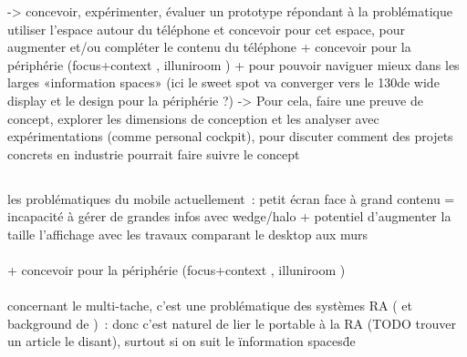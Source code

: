 -> concevoir, expérimenter, évaluer un prototype répondant à la problématique
utiliser l'espace autour du téléphone et concevoir pour cet espace, pour augmenter et/ou compléter le contenu du téléphone 
+ concevoir pour la périphérie (focus+context \cite{CockburnKarlsonBederson2009}, illuniroom \cite{JonesBenkoOfekEtAl2013}) 
+ pour pouvoir naviguer mieux dans les larges «information spaces» \cite{RaedleJetterMuellerEtAl2014} (ici le sweet spot va converger vers le 130\textdegree de wide display et le design pour la périphérie ?) -> Pour cela, faire une preuve de concept, explorer les dimensions de conception et les analyser avec expérimentations (comme personal cockpit), pour discuter comment des projets concrets en industrie pourrait faire suivre le concept


\subsection*{} %
\paragraph*{}
les problématiques du mobile actuellement~: petit écran face à grand contenu = incapacité à gérer de grandes infos 
avec wedge/halo \cite{BaudischRosenholtz2003} \cite{GustafsonBaudischGutwinEtAl2008} \cite{BurigatChittaro2011} 
+ potentiel d'augmenter la taille l'affichage avec les travaux comparant le desktop aux murs \cite{LiuChapuisBeaudouin-LafonEtAl2014} \cite{ShuppBallYostEtAl2006} \cite{TanGergleScupelliEtAl2003}

\paragraph*{}
+ concevoir pour la périphérie (focus+context \cite{CockburnKarlsonBederson2009}, illuniroom \cite{JonesBenkoOfekEtAl2013})

\paragraph*{}
concernant le multi-tache, c'est une problématique des systèmes RA (\cite{SchmalstiegFuhrmannHesinaEtAl2002} et background de \cite{EnsFinneganIrani2014})~: donc c'est naturel de lier le portable à la RA (TODO trouver un article le disant), surtout si on suit le \"information spaces\" de \cite{EnsHincapie-RamosIrani2014}
\cite{TanCzerwinski2003}
\cite{RashidNacentaQuigley2012a}

